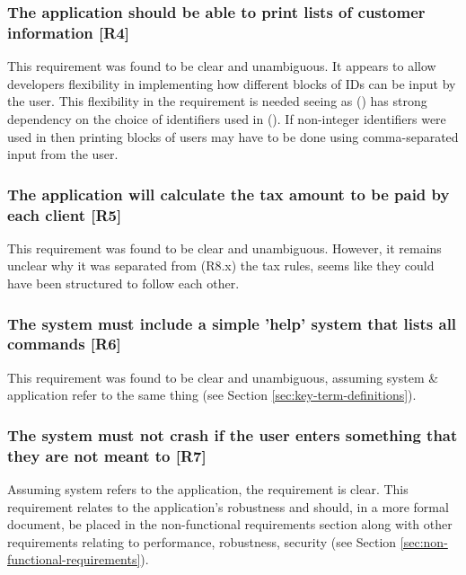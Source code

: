 \subsubsection{The application should be able to print lists of customer information [R4]}
This requirement was found to be clear and unambiguous. 
It appears to allow developers flexibility in implementing how different blocks of IDs can be input by the user. This flexibility in the requirement is needed seeing as (\RFour) has strong dependency on the choice of identifiers used in (\RTwo). If non-integer identifiers were used in \RTwo \space then printing blocks of users may have to be done using comma-separated input from the user. 

\subsubsection{The application will calculate the tax amount to be paid by each client [R5]} 
This requirement was found to be clear and unambiguous. 
However, it remains unclear why it was separated from (R8.x) the tax rules, seems like they could have been structured to follow each other. 

\subsubsection{The system must include a simple 'help' system that lists all commands [R6]}

This requirement was found to be clear and unambiguous, assuming system \& application refer to the same thing (see Section \ref{sec:key-term-definitions}). 

\subsubsection{The system must not crash if the user enters something that they are not meant to [R7]}
Assuming system refers to the application, the requirement is clear. 
This requirement relates to the application's robustness and should, in a more formal document, be placed in the non-functional requirements section along with other requirements relating to performance, robustness, security (see Section \ref{sec:non-functional-requirements}).

